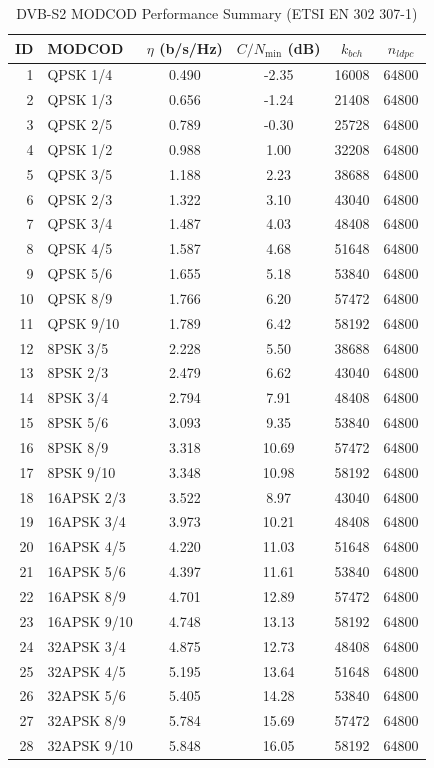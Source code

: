 \begin{table}[ht]
\centering
\caption{DVB-S2 MODCOD Performance Summary (ETSI EN 302 307-1)}
\label{tab:dvbs2_modcod}
\begin{tabular}{|r|l|c|c|c|c|}
\hline
ID & MODCOD & $\eta$ (b/s/Hz) & $C/N_{\min}$ (dB) & $k_{bch}$ & $n_{ldpc}$ \\
\hline
1 & QPSK 1/4 & 0.490 & -2.35 & 16008 & 64800 \\
2 & QPSK 1/3 & 0.656 & -1.24 & 21408 & 64800 \\
3 & QPSK 2/5 & 0.789 & -0.30 & 25728 & 64800 \\
4 & QPSK 1/2 & 0.988 & 1.00 & 32208 & 64800 \\
5 & QPSK 3/5 & 1.188 & 2.23 & 38688 & 64800 \\
6 & QPSK 2/3 & 1.322 & 3.10 & 43040 & 64800 \\
7 & QPSK 3/4 & 1.487 & 4.03 & 48408 & 64800 \\
8 & QPSK 4/5 & 1.587 & 4.68 & 51648 & 64800 \\
9 & QPSK 5/6 & 1.655 & 5.18 & 53840 & 64800 \\
10 & QPSK 8/9 & 1.766 & 6.20 & 57472 & 64800 \\
11 & QPSK 9/10 & 1.789 & 6.42 & 58192 & 64800 \\
12 & 8PSK 3/5 & 2.228 & 5.50 & 38688 & 64800 \\
13 & 8PSK 2/3 & 2.479 & 6.62 & 43040 & 64800 \\
14 & 8PSK 3/4 & 2.794 & 7.91 & 48408 & 64800 \\
15 & 8PSK 5/6 & 3.093 & 9.35 & 53840 & 64800 \\
16 & 8PSK 8/9 & 3.318 & 10.69 & 57472 & 64800 \\
17 & 8PSK 9/10 & 3.348 & 10.98 & 58192 & 64800 \\
18 & 16APSK 2/3 & 3.522 & 8.97 & 43040 & 64800 \\
19 & 16APSK 3/4 & 3.973 & 10.21 & 48408 & 64800 \\
20 & 16APSK 4/5 & 4.220 & 11.03 & 51648 & 64800 \\
21 & 16APSK 5/6 & 4.397 & 11.61 & 53840 & 64800 \\
22 & 16APSK 8/9 & 4.701 & 12.89 & 57472 & 64800 \\
23 & 16APSK 9/10 & 4.748 & 13.13 & 58192 & 64800 \\
24 & 32APSK 3/4 & 4.875 & 12.73 & 48408 & 64800 \\
25 & 32APSK 4/5 & 5.195 & 13.64 & 51648 & 64800 \\
26 & 32APSK 5/6 & 5.405 & 14.28 & 53840 & 64800 \\
27 & 32APSK 8/9 & 5.784 & 15.69 & 57472 & 64800 \\
28 & 32APSK 9/10 & 5.848 & 16.05 & 58192 & 64800 \\
\hline
\end{tabular}
\end{table}